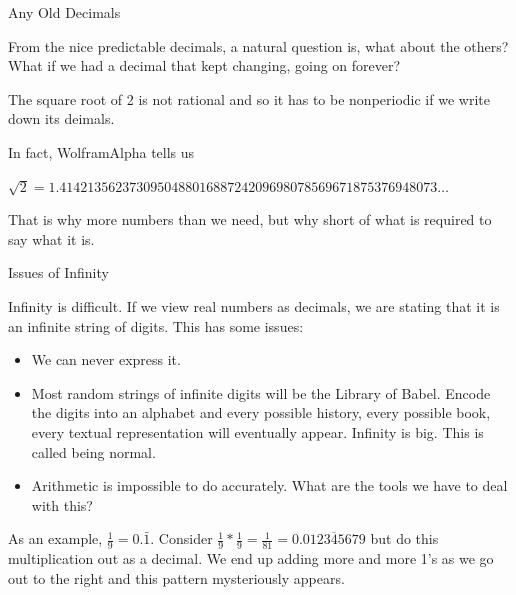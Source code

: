 \documentclass{beamer}
\begin{document}
\begin{frame}{Any Old Decimals}

    From the nice predictable decimals, a natural question is, what about the others? What if we had a decimal that kept changing, going on forever? 

    The square root of 2 is not rational and so it has to be nonperiodic if we write down its deimals. 

    In fact, WolframAlpha tells us

    $\sqrt{2} = 1.414213562373095048801688724209698078569671875376948073\ldots$

    That is why more numbers than we need, but why short of what is required to say what it is. 
    
\end{frame}

\begin{frame}{Issues of Infinity}

    Infinity is difficult. If we view real numbers as decimals, we are stating that it is an infinite string of digits. This has some issues: 

    \begin{itemize}
        \item We can never express it. 
        \item Most random strings of infinite digits will be the Library of Babel. Encode the digits into an alphabet and every possible history, every possible book, every textual representation will eventually appear. Infinity is big. This is called being normal. 
        \item Arithmetic is impossible to do accurately. What are the tools we have to deal with this? 
    \end{itemize}

    As an example, $\frac{1}{9} = 0.\bar{1}$. Consider $\frac{1}{9}*\frac{1}{9} = \frac{1}{81} = 0.\overline{012345679}$ but do this multiplication out as a decimal. We end up adding more and more 1's as we go out to the right and this pattern mysteriously appears. 
    
\end{frame}
\end{document}
